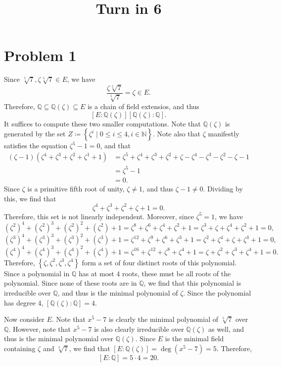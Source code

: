 \documentclass[11pt, letterpaper]{article}
\title{Turn in 6}
\begin{document}
\makeproblem
\section*{Problem 1}
Since $\sqrt[5]{7} ,\zeta \sqrt[5]{7} \in E$, we have
\[
	\frac{\zeta \sqrt[5]{7} }{\sqrt[5]{7} } =\zeta \in E
.\]
Therefore, $\mathbb{Q} \subseteq \mathbb{Q} (\zeta )\subseteq E$ is a chain of field extensios, and thus
\[
	\left[ E:\mathbb{Q} (\zeta ) \right] \left[ \mathbb{Q} (\zeta ):\mathbb{Q}  \right] .
\]
It suffices to compute these two smaller computations. Note that $\mathbb{Q} (\zeta )$ is generated by the set $Z\coloneqq \left\{ \zeta ^i\mid 0\leq i\leq 4,i\in\mathbb{N}  \right\} $. Note also that $\zeta $ manifestly satisfies the equation $\zeta ^5-1=0$, and that
\begin{align*}
	\left( \zeta -1 \right) \left( \zeta ^4+\zeta ^3+\zeta ^2+\zeta ^1+1 \right) &=\zeta ^5+\zeta ^4+\zeta ^3+\zeta ^2+\zeta -\zeta ^4-\zeta ^3-\zeta ^2-\zeta -1\\
										     &=\zeta ^5-1\\
										     &=0
.\end{align*}
Since $\zeta $ is a primitive fifth root of unity, $\zeta \neq 1$, and thus $\zeta -1\neq 0$. Dividing by this, we find that
\[
	\zeta ^4+\zeta ^3+\zeta ^2+\zeta +1=0
.\]
Therefore, this set is not linearly independent. Moreover, since $\zeta ^5=1$, we have
\[
	\left( \zeta ^2 \right) ^4+\left( \zeta ^2 \right) ^3+\left( \zeta ^2 \right) ^2+\left( \zeta ^2 \right) +1=\zeta ^8+\zeta ^6+\zeta ^4+\zeta ^2+1=\zeta ^3+\zeta +\zeta ^4+\zeta ^2+1=0,
\]
\[
	\left( \zeta ^3 \right) ^4+\left( \zeta ^3 \right) ^3+\left( \zeta ^3 \right) ^2+\left( \zeta ^3 \right) +1=\zeta ^{12} +\zeta ^9+\zeta ^6+\zeta ^3+1=\zeta ^2+\zeta ^4+\zeta +\zeta ^3+1=0,
\]
\[
	\left( \zeta ^4 \right) ^4+\left( \zeta ^4 \right) ^3+\left( \zeta ^4 \right) ^2+\left( \zeta ^4 \right) +1=\zeta ^{16} +\zeta ^{12} +\zeta ^8+\zeta ^4+1=\zeta +\zeta ^2+\zeta ^3+\zeta ^4+1=0
.\]
Therefore, $\left\{ \zeta ,\zeta ^2,\zeta ^3,\zeta ^4 \right\} $ form a set of four distinct roots of this polynomial. Since a polynomial in $\mathbb{Q} $ has at most 4 roots, these must be all roots of the polynomial. Since none of these roots are in $\mathbb{Q} $, we find that this polynomial is irreducible over $\mathbb{Q} $, and thus is the minimal polynomial of $\zeta $. Since the polynomial has degree 4, $\left[ \mathbb{Q}(\zeta ):\mathbb{Q}  \right] =4$.

Now consider $E$. Note that $x^5-7$ is clearly the minimal polynomial of $\sqrt[5]{7} $ over $\mathbb{Q} $. However, note that $x^5-7$ is also clearly irreducible over $\mathbb{Q} (\zeta )$ as well, and thus is the minimal polynomial over $\mathbb{Q} (\zeta )$. Since $E$ is the minimal field containing $\zeta $ and $\sqrt[5]{7} $, we find that $\left[ E:\mathbb{Q} (\zeta ) \right] =\operatorname{deg} (x^5-7)=5$. Therefore,
\[
	\left[ E:\mathbb{Q}  \right] =5\cdot 4=20
.\]
\end{document}

